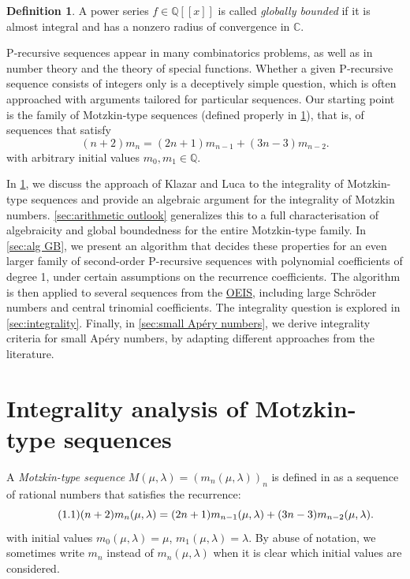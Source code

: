\documentclass[11pt]{article}
\theoremstyle{definition}
\newtheorem{defi}{Definition}[section]
\theoremstyle{plain}
\theoremstyle{remark}
\begin{document}
\begin{defi}\label{defi:gb}
A power series $f \in \mathbb{Q}[[x]]$ is called \textit{globally bounded} if it is almost integral and has a nonzero radius of convergence in $\mathbb{C}$.
\end{defi}
P‑recursive sequences appear in many combinatorics problems, as well as in number theory and the theory of special functions. Whether a given P‑recursive sequence consists of integers only is a deceptively simple question, which is often approached with arguments tailored for particular sequences.
Our starting point is the family of Motzkin‑type sequences (defined properly in \cref{sec:Motzkin}), that is, of sequences that satisfy
\[(n+2)m_n = (2n+1)m_{n-1}+(3n-3)m_{n-2}.\]
with arbitrary initial values $m_0,m_1 \in \mathbb{Q}$. 

In \cref{sec:Motzkin}, we discuss the approach of Klazar and Luca to the integrality of Motzkin-type sequences and provide an algebraic argument for the integrality of Motzkin numbers. \cref{sec:arithmetic outlook} generalizes this to a full characterisation of algebraicity and global boundedness for the entire Motzkin-type family. In \cref{sec:alg GB}, we present an algorithm that decides these properties for an even larger family of second-order P-recursive sequences with polynomial coefficients of degree 1, under certain assumptions on the recurrence coefficients. The algorithm is then applied to several sequences from the \href{https://oeis.org/}{OEIS}, including large Schröder numbers and central trinomial coefficients. The integrality question is explored in \cref{sec:integrality}. Finally, in \cref{sec:small Apéry numbers}, we derive integrality criteria for small Apéry numbers, by adapting different approaches from the literature.

\section{Integrality analysis of Motzkin-type sequences}\label{sec:Motzkin}

A \textit{Motzkin-type sequence} $M(\mu, \lambda) = (m_n(\mu, \lambda))_n$ is defined in \cite{KL05} as a sequence of rational numbers that satisfies the recurrence:
\begin{equation} \label{eq:{1.1}} \tag{1.1}
(n+2)m_n(\mu, \lambda) = (2n+1)m_{n-1}(\mu, \lambda)+(3n-3)m_{n-2}(\mu, \lambda).
\end{equation}
with initial values $m_0(\mu, \lambda) = \mu$, $m_1(\mu, \lambda) = \lambda$. By abuse of notation, we sometimes write $m_n$ instead of $m_n(\mu, \lambda)$ when it is clear which initial values are considered.
\end{document}
